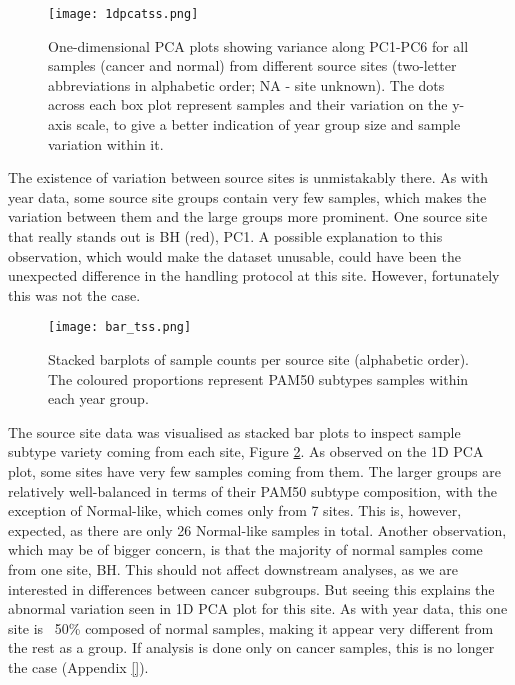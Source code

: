            
            \begin{figure}[!h]
            \centering
            \texttt{[image: 1dpcatss.png]}
            \caption[1D PCA plot based on sample source site data]{One-dimensional PCA plots showing variance along PC1-PC6 for all samples (cancer and normal) from different source sites (two-letter abbreviations in alphabetic order; NA - site unknown). The dots across each box plot represent samples and their variation on the y-axis scale, to give a better indication of year group size and sample variation within it.}
            \label{fig:1dpcatss}
            \end{figure}
            
            
    \newpage
    The existence of variation between source sites is unmistakably there. As with year data, some source site groups contain very few samples, which makes the variation between them and the large groups more prominent. One source site that really stands out is BH (red), PC1. A possible explanation to this observation, which would make the dataset unusable, could have been the unexpected difference in the handling protocol at this site. However, fortunately this was not the case.  \\
    
            \begin{figure}[!h]
            \centering
            \texttt{[image: bar\_tss.png]}
            \caption[Stacked barplots of sample counts per year]{Stacked barplots of sample counts per source site (alphabetic order). The coloured proportions represent PAM50 subtypes samples within each year group. }
            \label{fig:bartss}
            \end{figure}
    
    The source site data was visualised as stacked bar plots to inspect sample subtype variety coming from each site, Figure \ref{fig:bartss}. As observed on the 1D PCA plot, some sites have very few samples coming from them. The larger groups are relatively well-balanced in terms of their PAM50 subtype composition, with the exception of Normal-like, which comes only from 7 sites. This is, however, expected, as there are only 26 Normal-like samples in total. Another observation, which may be of bigger concern, is that the majority of normal samples come from one site, BH. This should not affect downstream analyses, as we are interested in differences between cancer subgroups. But seeing this explains the abnormal variation seen in 1D PCA plot for this site. As with year data, this one site is ~50\% composed of normal samples, making it appear very different from the rest as a group. If analysis is done only on cancer samples, this is no longer the case (Appendix \ref{}). 
    
